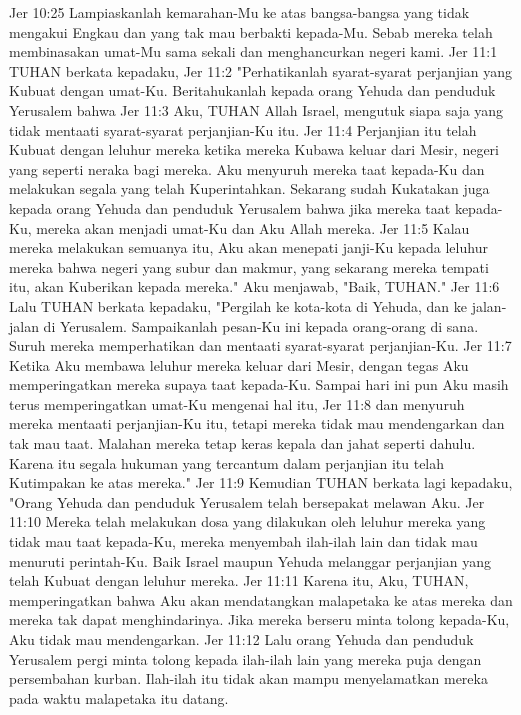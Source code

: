 Jer 10:25  Lampiaskanlah kemarahan-Mu ke atas bangsa-bangsa yang tidak mengakui Engkau dan yang tak mau berbakti kepada-Mu. Sebab mereka telah membinasakan umat-Mu sama sekali dan menghancurkan negeri kami.
Jer 11:1  TUHAN berkata kepadaku,
Jer 11:2  "Perhatikanlah syarat-syarat perjanjian yang Kubuat dengan umat-Ku. Beritahukanlah kepada orang Yehuda dan penduduk Yerusalem bahwa
Jer 11:3  Aku, TUHAN Allah Israel, mengutuk siapa saja yang tidak mentaati syarat-syarat perjanjian-Ku itu.
Jer 11:4  Perjanjian itu telah Kubuat dengan leluhur mereka ketika mereka Kubawa keluar dari Mesir, negeri yang seperti neraka bagi mereka. Aku menyuruh mereka taat kepada-Ku dan melakukan segala yang telah Kuperintahkan. Sekarang sudah Kukatakan juga kepada orang Yehuda dan penduduk Yerusalem bahwa jika mereka taat kepada-Ku, mereka akan menjadi umat-Ku dan Aku Allah mereka.
Jer 11:5  Kalau mereka melakukan semuanya itu, Aku akan menepati janji-Ku kepada leluhur mereka bahwa negeri yang subur dan makmur, yang sekarang mereka tempati itu, akan Kuberikan kepada mereka." Aku menjawab, "Baik, TUHAN."
Jer 11:6  Lalu TUHAN berkata kepadaku, "Pergilah ke kota-kota di Yehuda, dan ke jalan-jalan di Yerusalem. Sampaikanlah pesan-Ku ini kepada orang-orang di sana. Suruh mereka memperhatikan dan mentaati syarat-syarat perjanjian-Ku.
Jer 11:7  Ketika Aku membawa leluhur mereka keluar dari Mesir, dengan tegas Aku memperingatkan mereka supaya taat kepada-Ku. Sampai hari ini pun Aku masih terus memperingatkan umat-Ku mengenai hal itu,
Jer 11:8  dan menyuruh mereka mentaati perjanjian-Ku itu, tetapi mereka tidak mau mendengarkan dan tak mau taat. Malahan mereka tetap keras kepala dan jahat seperti dahulu. Karena itu segala hukuman yang tercantum dalam perjanjian itu telah Kutimpakan ke atas mereka."
Jer 11:9  Kemudian TUHAN berkata lagi kepadaku, "Orang Yehuda dan penduduk Yerusalem telah bersepakat melawan Aku.
Jer 11:10  Mereka telah melakukan dosa yang dilakukan oleh leluhur mereka yang tidak mau taat kepada-Ku, mereka menyembah ilah-ilah lain dan tidak mau menuruti perintah-Ku. Baik Israel maupun Yehuda melanggar perjanjian yang telah Kubuat dengan leluhur mereka.
Jer 11:11  Karena itu, Aku, TUHAN, memperingatkan bahwa Aku akan mendatangkan malapetaka ke atas mereka dan mereka tak dapat menghindarinya. Jika mereka berseru minta tolong kepada-Ku, Aku tidak mau mendengarkan.
Jer 11:12  Lalu orang Yehuda dan penduduk Yerusalem pergi minta tolong kepada ilah-ilah lain yang mereka puja dengan persembahan kurban. Ilah-ilah itu tidak akan mampu menyelamatkan mereka pada waktu malapetaka itu datang.
